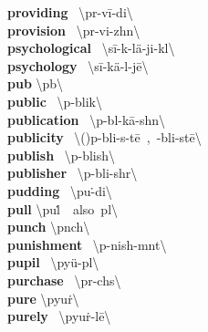 \documentclass[10pt,a4paper]{article}
\begin{document}
\begin{multicols}{2}
\textbf{ providing }\quad \ \textbackslash pr\textschwa -\textprimstress v\={i}-di\engma \textbackslash \\
\textbf{ provision }\quad \ \textbackslash pr\textschwa -\textprimstress vi-zh\textschwa n\textbackslash \\
\textbf{ psychological }\quad \ \textbackslash \textsecstress s\={i}-k\textschwa -\textprimstress l\"{a}-ji-k\textschwa l\textbackslash \\
\textbf{ psychology }\quad \ \textbackslash s\={i}-\textprimstress k\"{a}-l\textschwa -j\={e}\textbackslash \\
\textbf{ pub }\quad \textbackslash \textprimstress p\textschwa b\textbackslash \\
\textbf{ public }\quad \ \textbackslash \textprimstress p\textschwa -blik\textbackslash \\
\textbf{ publication }\quad \ \textbackslash \textsecstress p\textschwa -bl\textschwa -\textprimstress k\={a}-sh\textschwa n\textbackslash \\
\textbf{ publicity }\quad \ \textbackslash (\textsecstress )p\textschwa -\textprimstress bli-s\textschwa -t\={e}\ ,\ -\textprimstress bli-st\={e}\textbackslash \\
\textbf{ publish }\quad \ \textbackslash \textprimstress p\textschwa -blish\textbackslash \\
\textbf{ publisher }\quad \ \textbackslash \textprimstress p\textschwa -bli-sh\textschwa r\textbackslash \\
\textbf{ pudding }\quad \ \textbackslash \textprimstress pu\. -di\engma \textbackslash \\
\textbf{ pull }\quad \textbackslash \textprimstress pu\. l\ \ also\ \textprimstress p\textschwa l\textbackslash \\
\textbf{ punch }\quad \textbackslash \textprimstress p\textschwa nch\textbackslash \\
\textbf{ punishment }\quad \ \textbackslash \textprimstress p\textschwa -nish-m\textschwa nt\textbackslash \\
\textbf{ pupil }\quad \ \textbackslash \textprimstress py\"{u}-p\textschwa l\textbackslash \\
\textbf{ purchase }\quad \ \textbackslash \textprimstress p\textschwa r-ch\textschwa s\textbackslash \\
\textbf{ pure }\quad \textbackslash \textprimstress pyu\. r\textbackslash \\
\textbf{ purely }\quad \ \textbackslash \textprimstress pyu\. r-l\={e}\textbackslash \\

\end{multicols}
\end{document}
